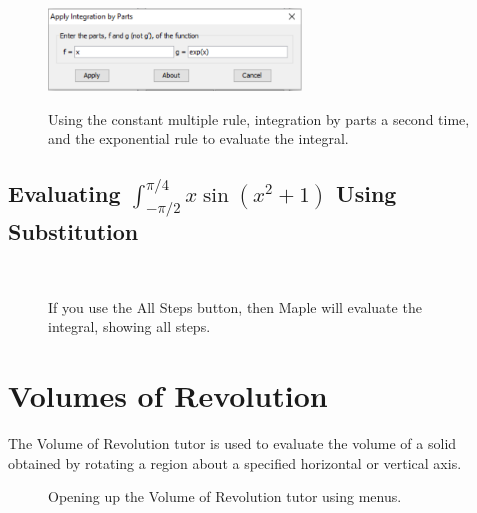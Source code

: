 \begin{figure}[h]
\caption{Using the constant multiple rule, integration by parts a second time, and the exponential rule to evaluate the integral.}
\centering
{}\\
\includegraphics[width=0.6\textwidth]{tutorials/figures/IntTutorQ1-5-eps-converted-to.pdf}
\\
\end{figure}

\clearpage

\subsection{Evaluating $\displaystyle\int_{-\pi/2}^{\pi/4} x\sin(x^2+1)$ Using Substitution}


\begin{figure}[h]
\caption{If you use the All Steps button, then Maple will evaluate the integral, showing all steps.}
\centering
{}\\
\end{figure}

\clearpage

\section{Volumes of Revolution}
\label{sec:volume_of_revolution_tutor}


The Volume of Revolution tutor is used to evaluate the volume of a solid obtained by rotating a region about a specified horizontal or vertical axis.

\begin{figure}[h]
\caption{Opening up the Volume of Revolution tutor using menus.}
\centering
{}
\end{figure}

